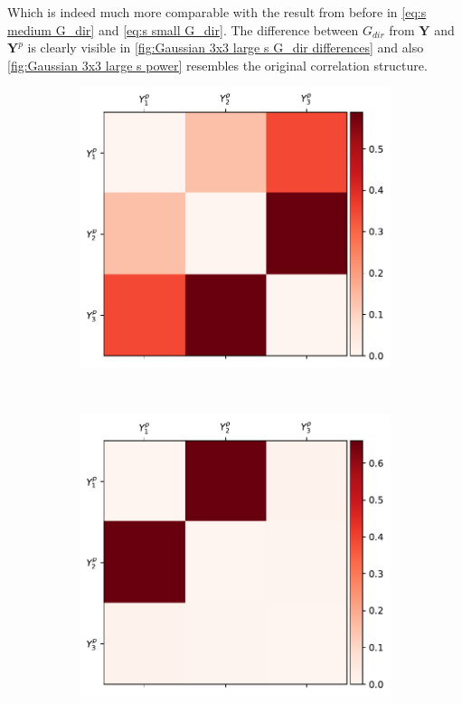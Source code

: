 \documentclass[../Thesis.tex]{subfiles}
\begin{document}
Which is indeed much more comparable with the result from before in \autoref{eq:s medium G_dir} and \autoref{eq:s small G_dir}. The difference between $G_{dir}$ from $\boldsymbol Y$ and $\boldsymbol Y^p$ is clearly visible in \autoref{fig:Gaussian 3x3 large s G_dir differences} and also \autoref{fig:Gaussian 3x3 large s power} resembles the original correlation structure.
\begin{figure}[H]
    \centering
    \begin{subfigure}[t]{0.49\textwidth}
        \centering
        \includegraphics[width=\linewidth]{figures/ND examples/Gaussian 3x3 large s.pdf}
        \caption{}
        \label{fig:Gaussian 3x3 large s}
    \end{subfigure}%
    ~
    \begin{subfigure}[t]{0.49\textwidth}
        \centering
        \includegraphics[width=\linewidth]{figures/ND examples/Gaussian 3x3 large s power.pdf}

\end{subfigure}
\end{figure}
\end{document}
